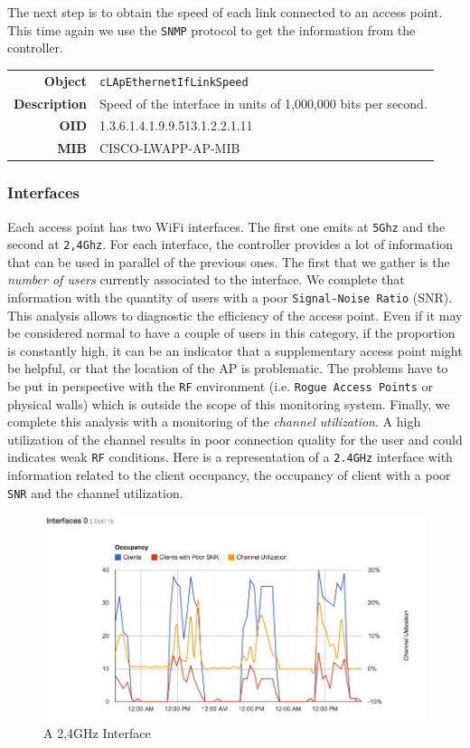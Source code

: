 The next step is to obtain the speed of each link connected to an access point. This time again we use the \texttt{SNMP} protocol to get the information from the controller.

\begin{tabular}{|r l|}
\hline
\textbf{Object} & \texttt{cLApEthernetIfLinkSpeed} \\
\textbf{Description} & \parbox{11cm}{Speed of the interface in units of 1,000,000 bits per second.} \\
\textbf{OID} & 1.3.6.1.4.1.9.9.513.1.2.2.1.11 \\
\textbf{MIB} & CISCO-LWAPP-AP-MIB \\
\hline
\end{tabular} 

\subsubsection*{Interfaces}
Each access point has two WiFi interfaces. The first one emits at \texttt{5Ghz} and the second at \texttt{2,4Ghz}. For each interface, the controller provides a lot of information that can be used in parallel of the previous ones. The first that we gather is the \textit{number of users} currently associated to the interface. We complete that information with the quantity of users with a poor \texttt{Signal-Noise Ratio} (SNR). This analysis allows to diagnostic the efficiency of the access point. Even if it may be considered normal to have a couple of users in this category, if the proportion is constantly high, it can be an indicator that a supplementary access point might be helpful, or that the location of the AP is problematic. The problems have to be put in perspective with the \texttt{RF} environment (i.e. \texttt{Rogue Access Points} or physical walls) which is outside the scope of this monitoring system. 
Finally, we complete this analysis with a monitoring of the \emph{channel utilization}. A high utilization of the channel results in poor connection quality for the user and could indicates weak \texttt{RF} conditions.
Here is a representation of a \texttt{2.4GHz} interface with information related to the client occupancy, the occupancy of client with a poor \texttt{SNR} and the channel utilization. 

\begin{figure}[H]
   \includegraphics[width=\textwidth]{Pictures/chapter5/interfaceLoad.png}
   \caption{A 2,4GHz Interface}
\end{figure}

